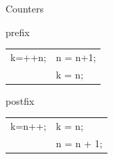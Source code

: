 \documentclass[xcolor={dvipsnames}]{beamer}
\begin{document}
\begin{frame}{Counters}
	\center
\begin{block}{prefix}
	\begin{tabularx}{\textwidth}{X X}
		k=++n; & n = n+1; \\
			   & k = n;\\
	\end{tabularx}
\end{block}
\begin{block}{postfix}
	\begin{tabularx}{\textwidth}{X X}
		k=n++; & k = n; \\
			   & n = n + 1;\\
	\end{tabularx}
\end{block}
\end{frame}
\end{document}
